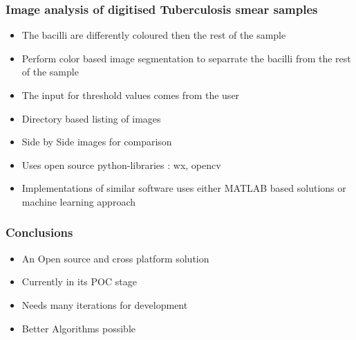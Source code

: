 \documentclass{beamer}
\begin{document}
\begin{frame}
\frametitle{Image analysis of digitised Tuberculosis smear samples}
    \begin{itemize}
	\item The bacilli are differently coloured then the rest of the sample
	\item Perform color based image segmentation to separrate the bacilli from the rest of the sample
	\item The input for threshold values comes from the user
	\item Directory based listing of images
	\item Side by Side images for comparison
	\item Uses open source python-libraries : wx, opencv
	\item Implementations of similar software uses either MATLAB based solutions or machine learning approach
	

    \end{itemize}
\end{frame}




\begin{frame}
\frametitle{Conclusions}
    \begin{itemize}
	\item An Open source  and cross platform solution
	\item Currently in its POC stage
	\item Needs many iterations for development
	\item Better Algorithms possible 
	
	

    \end{itemize}
        
\end{frame}
\end{document}
